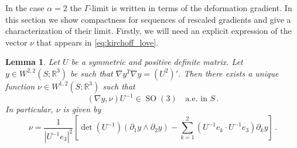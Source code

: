 \documentclass{article}
\theoremstyle{plain}
\theoremstyle{plain}
\theoremstyle{plain}
\newtheorem{lemma}[teo]{Lemma}
\theoremstyle{plain}
\theoremstyle{plain}
\theoremstyle{definition}
\theoremstyle{definition}
\renewcommand{\r}{\mathbb{R}}
\DeclareMathOperator{\SO}{SO}
\begin{document}
In the case $\alpha = 2$ the $\Gamma$-limit is written in terms of the deformation gradient. In this section we show compactness for sequences of rescaled gradients and give a characterization of their limit. Firstly, we will need an explicit expression of the vector $\nu$ that appears in \eqref{eq:kirchoff_love}. 

\begin{lemma}\label{lemma:definition_nu}
    Let $U$ be a symmetric and positive definite matrix. Let $y \in W^{2,2}(S; \r^3)$ be such that $\nabla y^T \nabla y = (U^2)'$. Then there exists a unique function $\nu \in W^{1, 2}(S; \r^3)$ such that
    \[
        (\nabla y, \nu) U^{-1} \in \SO(3) \quad \text{a.e. in $S$} \,.
    \]
    In particular, $\nu$ is given by
    \[
        \nu = \frac{1}{|U^{-1}e_3|^2} \left[ \det(U^{-1}) (\partial_1 y \wedge \partial_2 y) - \sum_{k=1}^2(U^{-1}e_k \cdot U^{-1} e_3)\partial_k y \right] \,.
    \]    
\end{lemma}
\end{document}
